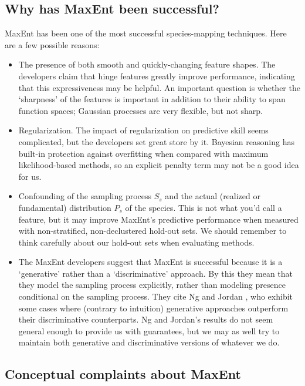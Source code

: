 \subsection{Why has MaxEnt been successful?}
MaxEnt has been one of the most successful species-mapping techniques. Here are a few possible reasons:
\begin{itemize}
    \item The presence of both smooth and quickly-changing feature shapes. The developers claim that hinge features greatly improve performance, indicating that this expressiveness may be helpful. An important question is whether the `sharpness' of the features is important in addition to their ability to span function spaces; Gaussian processes are very flexible, but not sharp.
    \item Regularization. The impact of regularization on predictive skill seems complicated, but the developers set great store by it. Bayesian reasoning has built-in protection against overfitting when compared with maximum likelihood-based methods, so an explicit penalty term may not be a good idea for us.
    \item Confounding of the sampling process $S_s$ and the actual (realized or fundamental) distribution $P_s$ of the species. This is not what you'd call a feature, but it may improve MaxEnt's predictive performance when measured with non-stratified, non-declustered hold-out sets. We should remember to think carefully about our hold-out sets when evaluating methods.
    \item The MaxEnt developers suggest that MaxEnt is successful because it is a `generative' rather than a `discriminative' approach. By this they mean that they model the sampling process explicitly, rather than modeling presence conditional on the sampling process. They cite Ng and Jordan \cite{Ng:2009p12220}, who exhibit some cases where (contrary to intuition) generative approaches outperform their discriminative counterparts. Ng and Jordan's results do not seem general enough to provide us with guarantees, but we may as well try to maintain both generative and discriminative versions of whatever we do.
\end{itemize}


\subsection{Conceptual complaints about MaxEnt}

\label{sec:weaknesses}

